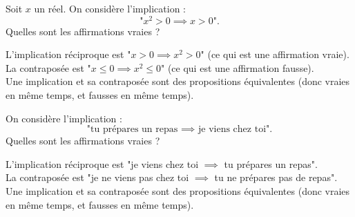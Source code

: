 \begin{question}
Soit $x$ un réel. On considère l'implication :
$$\text{"}x^2>0\implies x>0\text{".}$$
Quelles sont les affirmations vraies ?
\begin{answers}
\end{answers}
\begin{explanations}
L'implication réciproque est "$x>0\implies x^2>0$" (ce qui est une affirmation vraie). \\
La contraposée est "$x\le 0\implies x^2\le 0$" (ce qui est une affirmation fausse).\\
Une implication et sa contraposée sont des propositions équivalentes (donc vraies en même temps, et fausses en même temps). \\
\end{explanations}
\end{question}


\begin{question}
On considère l'implication :
$$\text{"tu prépares un repas } \implies \text{ je viens chez toi".}$$
Quelles sont les affirmations vraies ?
\begin{answers}
\end{answers}
\begin{explanations}
L'implication réciproque est "je viens chez toi $\implies$ tu prépares un repas". \\
La contraposée est "je ne viens pas chez toi $\implies$ tu ne prépares pas de repas".\\
Une implication et sa contraposée sont des propositions équivalentes (donc vraies en même temps, et fausses en même temps). \\
\end{explanations}
\end{question}


